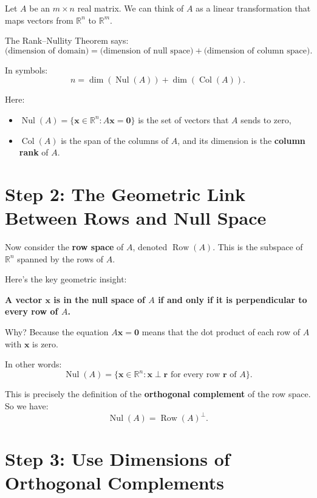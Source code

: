 \documentclass[11pt]{article}
\begin{document}
Let $ A $ be an $ m \times n $ real matrix.  
We can think of $ A $ as a linear transformation that maps vectors from $ \mathbb{R}^n $ to $ \mathbb{R}^m $.

The Rank--Nullity Theorem says:
\[
\text{(dimension of domain)} = \text{(dimension of null space)} + \text{(dimension of column space)}.
\]

In symbols:
\[
n = \dim(\operatorname{Nul}(A)) + \dim(\operatorname{Col}(A)).
\tag{1}
\]

Here:
\begin{itemize}
\item $ \operatorname{Nul}(A) = \{ \mathbf{x} \in \mathbb{R}^n : A\mathbf{x} = \mathbf{0} \} $ is the set of vectors that $ A $ sends to zero,
    \item $ \operatorname{Col}(A) $ is the span of the columns of $ A $, and its dimension is the \textbf{column rank} of $ A $.
\end{itemize}

\section*{Step 2: The Geometric Link Between Rows and Null Space}

Now consider the \textbf{row space} of $ A $, denoted $ \operatorname{Row}(A) $.  
This is the subspace of $ \mathbb{R}^n $ spanned by the rows of $ A $.

Here’s the key geometric insight:

\begin{center}
\textbf{A vector $ \mathbf{x} $ is in the null space of $ A $ if and only if it is perpendicular to every row of $ A $.}
\end{center}

Why? Because the equation $ A\mathbf{x} = \mathbf{0} $ means that the dot product of each row of $ A $ with $ \mathbf{x} $ is zero.

In other words:
\[
\operatorname{Nul}(A) = \{ \mathbf{x} \in \mathbb{R}^n : \mathbf{x} \perp \mathbf{r} \text{ for every row } \mathbf{r} \text{ of } A \}.
\]

This is precisely the definition of the \textbf{orthogonal complement} of the row space. So we have:
\[
\operatorname{Nul}(A) = \operatorname{Row}(A)^\perp.
\tag{2}
\]

\section*{Step 3: Use Dimensions of Orthogonal Complements}
\end{document}
